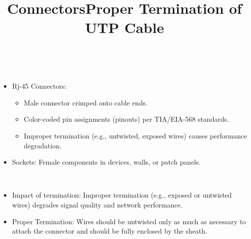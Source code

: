 \documentclass[a4paper,11pt]{article}
\begin{document}
\title{Connectors}\\
\begin{itemize}
    \item Rj-45 Connectors:\\
    \begin{itemize}
        \item Male connector crimped onto cable ends.\\
        \item Color-coded pin assignments (pinouts) per TIA/EIA-568 standards.\\
        \item Improper termination (e.g., untwisted, exposed wires) causes performance degradation.\\
    \end{itemize}
    \item Sockets: Female components in devices, walls, or patch panels.\\
\end{itemize}

\title{Proper Termination of UTP Cable}\\
\begin{itemize}
    \item Impact of termination: Improper termination (e.g., exposed or untwisted wires) degrades signal quality and network performance.\\
    \item Proper Termination: Wires should be untwisted only as much as necessary to attach the connector and should be fully enclosed by the sheath.\\
\end{itemize}
\end{document}
